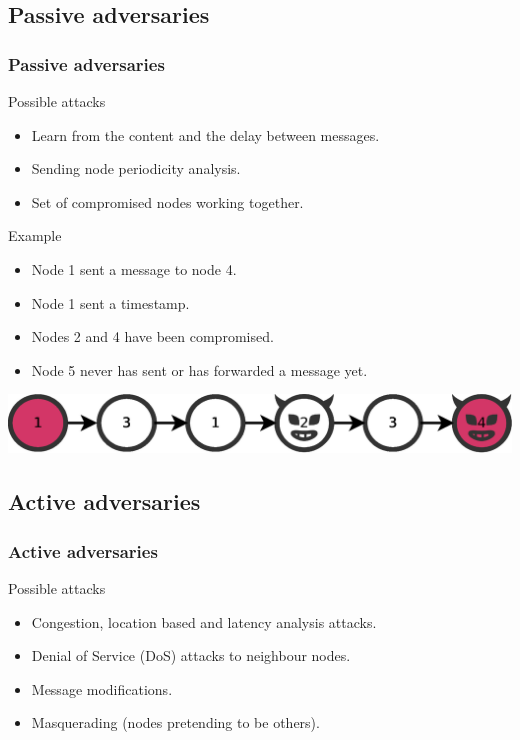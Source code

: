 \documentclass[compress,red]{beamer}
\begin{document}
\subsection{Passive adversaries}
\begin{frame}
\frametitle{Passive adversaries}
\begin{block}{Possible attacks}
\begin{itemize}
\item Learn from the content and the delay between messages.
\item Sending node periodicity analysis.
\item Set of compromised nodes working together.
\end{itemize}
\end{block}
\begin{block}{Example}
\begin{itemize}
\item Node 1 sent a message to node 4.
\item Node 1 sent a timestamp.
\item Nodes 2 and 4 have been compromised.
\item Node 5 never has sent or has forwarded a message yet.
\end{itemize}
\centering \includegraphics[width=.7\linewidth]{../paper/imgs/presentation/evil-path}
\end{block}
\end{frame}

\subsection{Active adversaries}
\begin{frame}
\frametitle{Active adversaries}
\begin{block}{Possible attacks}
\begin{itemize}
\item Congestion, location based and latency analysis attacks.
\item Denial of Service (DoS) attacks to neighbour nodes.
\item Message modifications.
\item Masquerading (nodes pretending to be others).
\end{itemize}
\end{block}
\end{frame}
\end{document}

